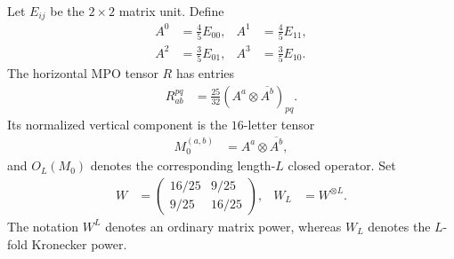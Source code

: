 \documentclass{article}
\begin{document}
Let $E_{ij}$ be the $2\times2$ matrix unit. Define
\begin{align}
    A^0 &= \frac45E_{00},
&
    A^1 &= \frac45E_{11},
\label{eq:cpgsv17_blocked_chi_uniformity_example_diagonal_letters}\\
    A^2 &= \frac35E_{01},
&
    A^3 &= \frac35E_{10}.
\label{eq:cpgsv17_blocked_chi_uniformity_example_offdiagonal_letters}
\end{align}
The horizontal MPO tensor $R$ has entries
\begin{align}
    R^{pq}_{ab}
        &= \frac{25}{32}
            \left(A^a\otimes\overline{A^b}\right)_{pq}.
\label{eq:cpgsv17_blocked_chi_uniformity_horizontal_tensor_R}
\end{align}
Its normalized vertical component is the $16$-letter tensor
\begin{align}
    M_0^{(a,b)}
        &= A^a\otimes\overline{A^b},
\label{eq:cpgsv17_blocked_chi_uniformity_vertical_component_M0}
\end{align}
and $O_L(M_0)$ denotes the corresponding length-$L$ closed operator. Set
\begin{align}
    W
        &= \begin{pmatrix}
            16/25 & 9/25\\
            9/25 & 16/25
        \end{pmatrix},
&
    W_L
        &= W^{\otimes L}.
\label{eq:cpgsv17_blocked_chi_uniformity_example_W_definitions}
\end{align}
The notation $W^L$ denotes an ordinary matrix power, whereas $W_L$ denotes
the $L$-fold Kronecker power.
\end{document}
